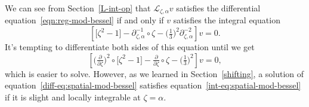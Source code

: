 \documentclass{article}
\newcommand{\fracderiv}[3]{\partial^{#1}_{#2, #3}}
\newcommand{\laplace}{\mathcal{L}}
\theoremstyle{definition}
\theoremstyle{plain}
\begin{document}
We can see from Section~\ref{L-int-op} that $\laplace_{\zeta, \alpha} v$ satisfies the differential equation~\eqref{eqn:reg-mod-bessel} if and only if $v$ satisfies the integral equation
\begin{equation}\label{int-eq:spatial-mod-bessel}
\left[ \big[ \zeta^2 - 1 \big] - \fracderiv{-1}{\zeta}{\alpha} \circ \zeta - \big(\tfrac{1}{3}\big)^2 \fracderiv{-2}{\zeta}{\alpha} \right] v = 0.
\end{equation}
It's tempting to differentiate both sides of this equation until we get
\begin{equation}\label{diff-eq:spatial-mod-bessel}
\left[ \big(\tfrac{\partial}{\partial \zeta}\big)^2 \circ \big[ \zeta^2 - 1 \big] - \tfrac{\partial}{\partial \zeta} \circ \zeta - \big(\tfrac{1}{3}\big)^2 \right] v = 0,
\end{equation}
which is easier to solve. However, as we learned in Section~\ref{shifting}, a solution of equation~\eqref{diff-eq:spatial-mod-bessel} satisfies equation~\eqref{int-eq:spatial-mod-bessel} if it is slight and locally integrable at $\zeta = \alpha$. 
\end{document}
